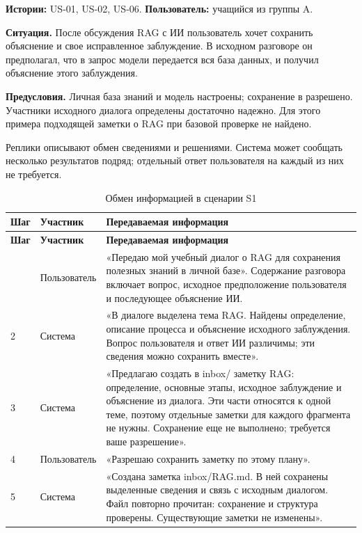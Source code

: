 \textbf{Истории:} US-01, US-02, US-06. \textbf{Пользователь:} учащийся из группы A.


\textbf{Ситуация.} После обсуждения RAG с ИИ пользователь хочет сохранить объяснение и свое исправленное заблуждение. В исходном разговоре он предполагал, что в запрос модели передается вся база данных, и получил объяснение этого заблуждения.


\textbf{Предусловия.} Личная база знаний и модель настроены; сохранение в  разрешено. Участники исходного диалога определены достаточно надежно. Для этого примера подходящей заметки о RAG при базовой проверке не найдено.


Реплики описывают обмен сведениями и решениями. Система может сообщать несколько результатов подряд; отдельный ответ пользователя на каждый из них не требуется.


{\small\setlength{\tabcolsep}{5pt}\renewcommand{\arraystretch}{1.15}
\begin{longtable}{L{9mm}L{26mm}L{\dimexpr{}\tabcolsep-35mm\relax}}
\caption{Обмен информацией в сценарии S1}\\
\toprule
\textbf{Шаг} & \textbf{Участник} & \textbf{Передаваемая информация} \\
\midrule\endfirsthead
\toprule
\textbf{Шаг} & \textbf{Участник} & \textbf{Передаваемая информация} \\
\midrule\endhead
\bottomrule{} & Пользователь & «Передаю мой учебный диалог о RAG для сохранения полезных знаний в личной базе». Содержание разговора включает вопрос, исходное предположение пользователя и последующее объяснение ИИ. \\[5pt]
2 & Система & «В диалоге выделена тема RAG. Найдены определение, описание процесса и объяснение исходного заблуждения. Вопрос пользователя и ответ ИИ различимы; эти сведения можно сохранить вместе». \\[5pt]
3 & Система & «Предлагаю создать в inbox/ заметку RAG: определение, основные этапы, исходное заблуждение и объяснение из диалога. Эти части относятся к одной теме, поэтому отдельные заметки для каждого фрагмента не нужны. Сохранение еще не выполнено; требуется ваше разрешение». \\[5pt]
4 & Пользователь & «Разрешаю сохранить заметку по этому плану». \\[5pt]
5 & Система & «Создана заметка inbox/RAG.md. В ней сохранены выделенные сведения и связь с исходным диалогом. Файл повторно прочитан: сохранение и структура проверены. Существующие заметки не изменены». \\[5pt]
\end{longtable}}

